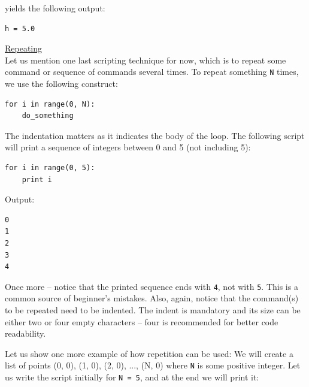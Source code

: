 \noindent
yields the following output:\\

\begin{bbox}
\begin{verbatim}
h = 5.0
\end{verbatim}
\end{bbox} 
\vspace{6mm}

\noindent
\underline{Repeating}\\

\noindent
Let us mention one last scripting technique for now, which is to repeat 
some command or sequence of commands several times. To repeat something 
{\tt N} times, we use the following construct: \\

\begin{bbox}
\begin{verbatim}
for i in range(0, N):
    do_something
\end{verbatim}
\end{bbox}
\vspace{6mm}

\noindent
The indentation matters as it indicates the body of the loop.
The following script will print a sequence of integers between 
0 and 5 (not including 5):\\

\begin{bbox}
\begin{verbatim}
for i in range(0, 5):
    print i
\end{verbatim}
\end{bbox}
\vspace{6mm}

\noindent
Output:

\begin{ybox}
\begin{verbatim}
0
1
2
3
4
\end{verbatim}
\end{ybox}
\vspace{6mm}

\noindent
Once more -- notice that the printed sequence ends with {\tt 4}, not with {\tt 5}.
This is a common source of beginner's mistakes.
Also, again, notice that the command(s) to be repeated need to be indented. The indent is mandatory and 
its size can be either two or four empty characters -- four is recommended for better
code readability.

Let us show one more example of how repetition can be used: We will create a list of 
points (0, 0), (1, 0), (2, 0), ..., (N, 0) where {\tt N} is some positive integer. Let us
write the script initially for {\tt N = 5}, and at the end we will print it:\\

